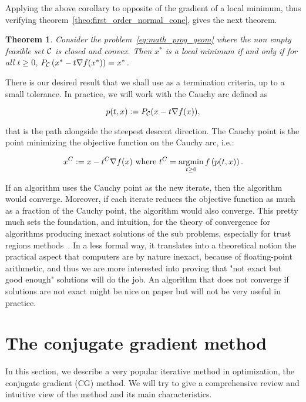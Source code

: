 \documentclass[10pt]{article}
\newtheorem{theorem}{Theorem}[]
\numberwithin{equation}{section}
\begin{document}
	Applying the above corollary to opposite of the gradient of a local minimum, thus verifying theorem~\ref{theo:first_order_normal_cone}, gives the next theorem.
	
	\begin{theorem}
	Consider the problem~\eqref{eq:math_prog_geom} where the non empty feasible set ${\mathcal{C}}$ is closed and convex. Then $x^*$ is a local minimum if and only if for all $t \ge 0$, $P_{\mathcal{C}}\left(x^*-t\nabla f(x^*)\right)=x^*$.
	\end{theorem}
	
	There is our desired result that we shall use as a termination criteria, up to a small tolerance. In practice, we will work with the Cauchy arc defined as
	
	\begin{equation}\label{eq:cauchy_arc}
		p(t,x) := P_{\mathcal{C}}(x-t\nabla f(x)),
	\end{equation}
	
	that is the path alongside the steepest descent direction. The Cauchy point is the point minimizing the objective function on the Cauchy arc, i.e.:
	
	\begin{equation}
		x^C := x - t^C \nabla f(x) \text{ where } t^C = \operatorname*{argmin}_{t \ge 0} f\left(p(t,x)\right).
	\end{equation}
	
	If an algorithm uses the Cauchy point as the new iterate, then the algorithm would converge. Moreover, if each iterate reduces the objective function as much as a fraction of the Cauchy point, the algorithm would also converge. This pretty much sets the foundation, and intuition, for the theory of convergence for algorithms producing inexact solutions of the sub problems, especially for trust regions methods~\cite{conn-etal:2000}. In a less formal way, it translates into a theoretical notion the practical aspect that computers are by nature inexact, because of floating-point arithmetic, and thus we are more interested into proving that "not exact but good enough" solutions will do the job. An algorithm that does not converge if solutions are not exact might be nice on paper but will not be very useful in practice.
	
	\section{The conjugate gradient method}
	
	In this section, we describe a very popular iterative method in optimization, the conjugate gradient (CG) method. We will try to give a comprehensive review and intuitive view of the method and its main characteristics. 
	
\end{document}
